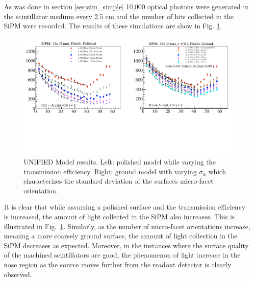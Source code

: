 As was done in section \ref{sec:sim_simple} 10,000 optical photons were generated in the scintillator medium every 2.5 cm and the number of hits collected in the SiPM were recorded.  The results of these simulations are show in Fig. \ref{fig:transm_eff_vs_sig_alpha}.
	\begin{figure}[!htb]
	\centering
	\includegraphics[width=1.0\columnwidth]{simulation/figs/transm_eff_vs_sig_alpha}
	\caption{UNIFIED Model results.  Left: polished model while varying the transmission efficiency.  Right: ground model with varying $\sigma_{\alpha}$ which characterizes the standard deviation of the surfaces micro-facet orientation.}
	\label{fig:transm_eff_vs_sig_alpha}
	\end{figure}
It is clear that while assuming a polished surface and the transmission efficiency is increased, the amount of light collected in the SiPM also increases.  This is illustrated in Fig.~\ref{fig:transm_eff_vs_sig_alpha}.  Similarly, as the number of micro-facet orientations increase, meaning a more coarsely ground surface, the amount of light collection in the SiPM decreases as expected.  Moreover, in the instances where the surface quality of the machined scintillators are good, the phenomenon of light increase in the nose region as the source moves further from the readout detector is clearly observed.

